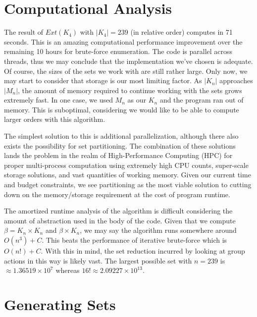 \documentclass[12pt]{report}
\begin{document}
\section{Computational Analysis}

\par The result of $Ext\left(K_4\right)$ with $\left|K_4\right|=239$ (in relative order) computes
in 71
seconds. This is an amazing computational performance improvement over the remaining 10 hours for
brute-force enumeration. The code is parallel across threads, thus we may conclude that the
implementation we've chosen is adequate. Of course, the sizes of the sets we work with are still
rather large. Only now, we may start to consider that storage is our most limiting factor. As
$\left|K_n\right|$ approaches $\left|M_n\right|$, the amount of memory required to continue working
with the sets grows extremely fast. In one case, we used $M_n$ as our $K_n$ and the program ran out
of memory. This is suboptimal, considering we would like to be able to compute larger orders with
this algorithm.

\par The simplest solution to this is additional parallelization, although there also exists the
possibility for set partitioning. The combination of these solutions lands the problem in the realm
of High-Performance Computing (HPC) for proper multi-process computation using extremely high CPU
counts, super-scale storage solutions, and vast quantities of working memory. Given our current
time and budget constraints, we see partitioning as the most viable solution to cutting down on the
memory/storage requirement at the cost of program runtime.

\par The amortized runtime analysis of the algorithm is difficult considering the amount of
abstraction used in the body of the code. Given that we compute $\beta = K_n \times K_n$ and $\beta
  \times K_n$, we may say the algorithm runs somewhere around $O\left(n^3\right)+C$. This beats the
performance of iterative brute-force which is $O\left(n!\right)+C$. With this in mind, the set
reduction incurred by looking at group actions in this way is likely vast. The largest possible set
with $n=239$ is $\approx 1.36519 \times 10^7$ whereas $16!\approx 2.09227 \times 10^{13}$.

\section{Generating Sets}
\end{document}
